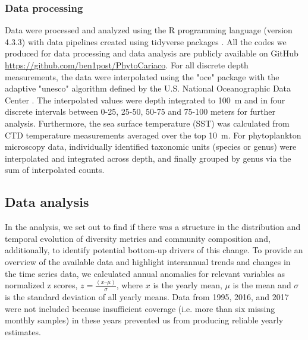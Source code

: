 \documentclass[draft]{agujournal2019}
\begin{document}
    \subsubsection{Data processing}
    Data were processed and analyzed using the R programming language (version 4.3.3) \cite{r_core_team_r_2024} with data pipelines created using tidyverse packages \cite{wickham_welcome_2019}. All the codes we produced for data processing and data analysis are publicly available on GitHub \url{https://github.com/ben1post/PhytoCariaco}.
    For all discrete depth measurements, the data were interpolated using the "oce" package \cite{kelley_oce_2023} with the adaptive "unesco" algorithm defined by the U.S. National Oceanographic Data Center \cite{johnson2006world}. The interpolated values were depth integrated to \qty{100}{\meter} and in four discrete intervals between 0-25, 25-50, 50-75 and 75-100 meters for further analysis. Furthermore, the sea surface temperature (SST) was calculated from CTD temperature measurements averaged over the top \qty{10}{\meter}. For phytoplankton microscopy data, individually identified taxonomic units (species or genus) were interpolated and integrated across depth, and finally grouped by genus via the sum of interpolated counts.


\subsection{Data analysis}    
    In the analysis, we set out to find if there was a structure in the distribution and temporal evolution of diversity metrics and community composition and, additionally, to identify potential bottom-up drivers of this change. 
    To provide an overview of the available data and highlight interannual trends and changes in the time series data, we calculated annual anomalies for relevant variables as normalized z scores, $z = \frac{(x – \mu)}{\sigma}$, where $x$ is the yearly mean, $\mu$ is the mean and $\sigma$ is the standard deviation of all yearly means. Data from 1995, 2016, and 2017 were not included because insufficient coverage (i.e. more than six missing monthly samples) in these years prevented us from producing reliable yearly estimates. 
    
\end{document}
